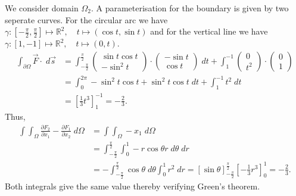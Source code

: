 \documentclass[11pt]{article}
\begin{document}
\begin{solution}
    We consider domain $\Omega_2$. A parameterisation for the boundary is given by two seperate curves. For the circular arc we have $\gamma: [-\frac{\pi}{2},\frac{\pi}{2}] \mapsto \mathbb{R}^2, \quad t\mapsto  (\cos t, \sin t)$ and for the vertical line we have  $\gamma: [1,-1] \mapsto \mathbb{R}^2, \quad t\mapsto  (0, t)$. 
    \begin{align*}
        \int_{\partial \Omega} \vec{F} \cdot \;d\vec{s} 
        &= 
        \int_{-\frac{\pi}{2}}^{\frac{\pi}{2}} 
        \begin{pmatrix}\sin t \cos t\\ -\sin^2 t \end{pmatrix} 
        \cdot 
        \begin{pmatrix}-\sin t \\ \cos t \end{pmatrix} \; d t 
        + 
        \int_1^ {-1} 
        \begin{pmatrix} 0 \\ t^2 \end{pmatrix}
        \cdot 
        \begin{pmatrix} 0 \\ 1 \end{pmatrix}
        \\&
        = 
        \int_0^{2\pi} -\sin^2 t\cos t + \sin^ 2 t \cos t \;dt + \int_{1}^ {-1} t^ 2 \;d t
        \\&
        = \left[\frac{1}{3} t^ 3\right]_1^ {-1}
        = -\frac{2}{3}
        .
    \end{align*}
    Thus, 
    \begin{align*}
        \int \int_{\Omega} \frac{\partial F_2}{\partial x_1} - \frac{\partial F_1}{\partial x_2} \;d \Omega &= \int \int_{\Omega} -x_1 \; d\Omega
        \\&= \int_{-\frac{\pi}{2}}^ {\frac{\pi}{2}} \int_0^1 -r\cos \theta r \;d\theta\;dr
        \\&= -\int_{-\frac{\pi}{2}}^ {\frac{\pi}{2}} \cos \theta \;d \theta \int_0^1 r^ 2 \;d r
        = \left[\sin \theta\right]_{-\frac{\pi}{2}}^ {\frac{\pi}{2}} \left[-\frac{1}{3}r^ 3\right]_0^{1} = -\frac{2}{3}
        .
    \end{align*}
    Both integrals give the same value thereby verifying Green's theorem.
\end{solution}
\end{document}
